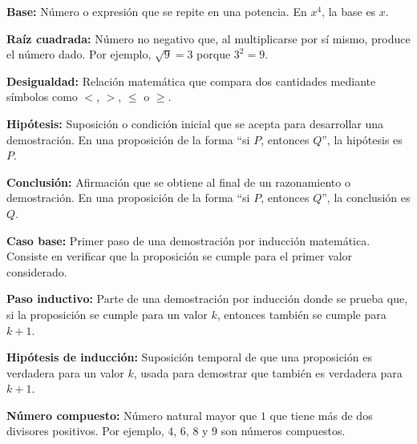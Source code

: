 \documentclass[12pt,final]{report}
\theoremstyle{plain}
\theoremstyle{definition}
\begin{document}
\vspace{0.5em}

\textbf{Base:} Número o expresión que se repite en una potencia. En $x^4$, la base es $x$.

\vspace{0.5em}

\textbf{Raíz cuadrada:} Número no negativo que, al multiplicarse por sí mismo, produce el número dado. Por ejemplo, $\sqrt{9}=3$ porque $3^2=9$.

\vspace{0.5em}

\textbf{Desigualdad:} Relación matemática que compara dos cantidades mediante símbolos como $<$, $>$, $\leq$ o $\geq$.

\vspace{0.5em}

\textbf{Hipótesis:} Suposición o condición inicial que se acepta para desarrollar una demostración. En una proposición de la forma ``si $P$, entonces $Q$'', la hipótesis es $P$.

\vspace{0.5em}

\textbf{Conclusión:} Afirmación que se obtiene al final de un razonamiento o demostración. En una proposición de la forma ``si $P$, entonces $Q$'', la conclusión es $Q$.

\vspace{0.5em}

\textbf{Caso base:} Primer paso de una demostración por inducción matemática. Consiste en verificar que la proposición se cumple para el primer valor considerado.

\vspace{0.5em}

\textbf{Paso inductivo:} Parte de una demostración por inducción donde se prueba que, si la proposición se cumple para un valor $k$, entonces también se cumple para $k+1$.

\vspace{0.5em}

\textbf{Hipótesis de inducción:} Suposición temporal de que una proposición es verdadera para un valor $k$, usada para demostrar que también es verdadera para $k+1$.

\vspace{0.5em}

\textbf{Número compuesto:} Número natural mayor que $1$ que tiene más de dos divisores positivos. Por ejemplo, $4$, $6$, $8$ y $9$ son números compuestos.

\vspace{0.5em}
\end{document}
